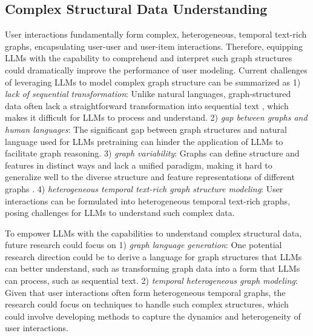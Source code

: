 \documentclass[11pt]{article}
\begin{document}
\subsection{Complex Structural Data Understanding}
User interactions fundamentally form complex, heterogeneous, temporal text-rich graphs, encapsulating user-user and user-item interactions. Therefore, equipping LLMs with the capability to comprehend and interpret such graph structures could dramatically improve the performance of user modeling. Current challenges of leveraging LLMs to model complex graph structure can be summarized as 1) \textit{lack of sequential transformation}: Unlike natural languages, graph-structured data often lack a straightforward transformation into sequential text \cite{wang2020calendar}, which makes it difficult for LLMs to process and understand. 2) \textit{gap between graphs and human languages}: The significant gap between graph structures and natural language used for LLMs pretraining can hinder the application of LLMs to facilitate graph reasoning. 3) \textit{graph variability}: Graphs can define structure and features in distinct ways and lack a unified paradigm, making it hard to generalize well to the diverse structure and feature representations of different graphs \cite{jiang2016catchtartan,wang2021modeling}. 4) \textit{heterogeneous temporal text-rich graph structure modeling}: User interactions can be formulated into heterogeneous temporal text-rich graphs, posing challenges for LLMs to understand such complex data.

To empower LLMs with the capabilities to understand complex structural data, future research could focus on 1) \textit{graph language generation}: One potential research direction could be to derive a language for graph structures that LLMs can better understand, such as transforming graph data into a form that LLMs can process, such as sequential text. 2) \textit{temporal heterogeneous graph modeling}: Given that user interactions often form heterogeneous temporal graphs, the research could focus on techniques to handle such complex structures, which could involve developing methods to capture the dynamics and heterogeneity of user interactions.


\end{document}

